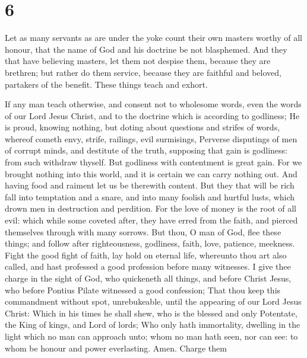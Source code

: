 \hypertarget{section-5}{%
\section{6}\label{section-5}}

 Let as many servants as are under the yoke count their
own masters worthy of all honour, that the name of God and his doctrine
be not blasphemed.  And they that have believing masters,
let them not despise them, because they are brethren; but rather do them
service, because they are faithful and beloved, partakers of the
benefit. These things teach and exhort.

 If any man teach otherwise, and consent not to wholesome
words, even the words of our Lord Jesus Christ, and to the doctrine
which is according to godliness;  He is proud, knowing
nothing, but doting about questions and strifes of words, whereof cometh
envy, strife, railings, evil surmisings,  Perverse
disputings of men of corrupt minds, and destitute of the truth,
supposing that gain is godliness: from such withdraw thyself.
 But godliness with contentment is great gain.
 For we brought nothing into this world, and it is certain
we can carry nothing out.  And having food and raiment let
us be therewith content.  But they that will be rich fall
into temptation and a snare, and into many foolish and hurtful lusts,
which drown men in destruction and perdition.  For the
love of money is the root of all evil: which while some coveted after,
they have erred from the faith, and pierced themselves through with many
sorrows.  But thou, O man of God, flee these things; and
follow after righteousness, godliness, faith, love, patience, meekness.
 Fight the good fight of faith, lay hold on eternal life,
whereunto thou art also called, and hast professed a good profession
before many witnesses.  I give thee charge in the sight
of God, who quickeneth all things, and before Christ Jesus, who before
Pontius Pilate witnessed a good confession;  That thou
keep this commandment without spot, unrebukeable, until the appearing of
our Lord Jesus Christ:  Which in his times he shall shew,
who is the blessed and only Potentate, the King of kings, and Lord of
lords;  Who only hath immortality, dwelling in the light
which no man can approach unto; whom no man hath seen, nor can see: to
whom be honour and power everlasting. Amen.  Charge them
